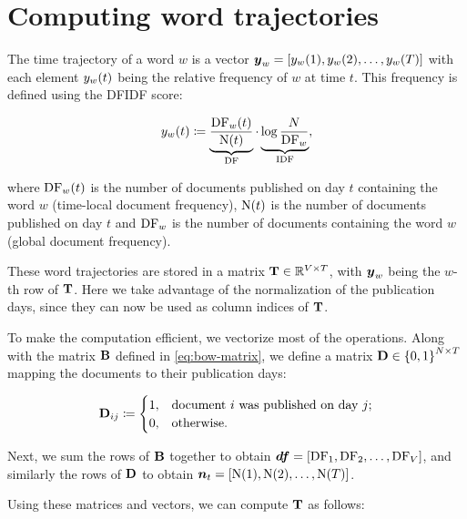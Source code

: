 \section{Computing word trajectories}
The time trajectory of a word $w$ is a vector $\vect{\traj}_{w} = \left[ \traj_{w}(1), \traj_{w}(2), \dots, \traj_{w}(\streamlen) \right]$ with each element $y_{w}(t)$ being the relative frequency of $w$ at time $t$. This frequency is defined using the DFIDF score:

\begin{equation}
	y_{w}(t) \coloneqq \underbrace{\frac{\text{DF}_{w}(t)}{\text{N}(t)}}_{\text{DF}} \cdot \underbrace{\log{\frac{N}{\text{DF}_{w}}}}_{\text{IDF}},
\end{equation}

where $\text{DF}_{w}(t)$ is the number of documents published on day $t$ containing the word $w$ (time-local document frequency), $\text{N}(t)$ is the number of documents published on day $t$ and $\text{DF}_{w}$ is the number of documents containing the word $w$ (global document frequency).

These word trajectories are stored in a matrix $\mathbf{T} \in \mathbb{R}^{V \times T}$, with $\vect{\traj}_w$ being the $w$-th row of $\mathbf{T}$. Here we take advantage of the normalization of the publication days, since they can now be used as column indices of $\mathbf{T}$.

To make the computation efficient, we vectorize most of the operations. Along with the matrix $\mathbf{B}$ defined in \ref{eq:bow-matrix}, we define a matrix $\mathbf{D} \in \left\{ 0, 1 \right\}^{N \times T}$ mapping the documents to their publication days:

\begin{equation}
	\mathbf{D}_{ij} \coloneqq
	\begin{cases}
		1, & \text{document}~i~\text{was published on day}~j \text{;} \\
		0, & \text{otherwise}.
	\end{cases}
\end{equation}

Next, we sum the rows of $\mathbf{B}$ together to obtain $\vect{\df} = \left[ \text{\df}_{1}, \text{\df}_{2}, \dots, \text{\df}_{\featcount} \right]$, and similarly the rows of $\mathbf{D}$ to obtain $\vect{\doccount}_{t} = \left[ \text{\doccount}(1), \text{\doccount}(2), \dots, \text{\doccount}(\streamlen) \right]$.

Using these matrices and vectors, we can compute $\mathbf{T}$ as follows:

